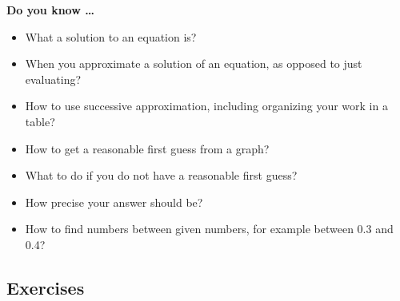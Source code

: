 
 

\noindent \textbf{Do you know \ldots}

\begin{itemize} 
\item What a solution to an equation is? 
\item When you approximate a solution of an equation, as opposed to just evaluating? 
\item How to use successive approximation, including organizing your work in a table? 
\item How to get a reasonable first guess from a graph? 
\item What to do if you do not have a reasonable first guess? 
\item How precise your answer should be? 
\item How to find numbers between given numbers, for example between 0.3 and 0.4? 
  
\end{itemize}

\subsection*{Exercises}

